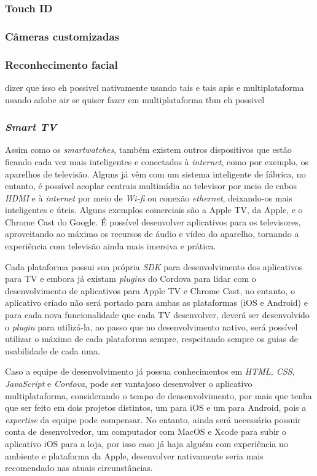 \subsubsection{Touch ID} \label{subsubsec:touchid}

\subsubsection{Câmeras customizadas} \label{subsubsec:customcamera}

\subsubsection{Reconhecimento facial} \label{subsubsec:facial}
dizer que isso eh possivel nativamente usando tais e tais apis e multiplataforma usando adobe air
se quiser fazer em multiplataforma tbm eh possivel

\subsubsection{\textit{Smart TV}} \label{subsubsec:tv}
Assim como os \textit{smartwatches}, também existem outros dispositivos que estão ficando cada vez mais inteligentes e conectados à \textit{internet}, como por exemplo, os aparelhos de televisão. Alguns já vêm
com um sistema inteligente de fábrica, no entanto, é possível acoplar centrais multimídia ao televisor por meio de cabos \textit{HDMI} e à \textit{internet} por meio de \textit{Wi-fi} ou conexão \textit{ethernet}, 
deixando-os mais inteligentes e úteis. Alguns exemplos comerciais são a Apple TV, da Apple, e o Chrome Cast do Google. É possível desenvolver aplicativos para os televisores, aproveitando ao máximo os recursos de 
áudio e vídeo do aparelho, tornando a experiência com televisão ainda mais imersiva e prática. 

Cada plataforma possui sua própria \textit{SDK} para desenvolvimento dos aplicativos para TV e embora já existam \textit{plugins} do Cordova para lidar com o desenvolvimento de aplicativos para Apple TV e Chrome Cast, 
no entanto, o aplicativo criado não será portado para ambas as plataformas (iOS e Android) e para cada nova funcionalidade que cada TV desenvolver, deverá ser desenvolvido o \textit{plugin} para utilizá-la, ao passo que 
no desenvolvimento nativo, será possível utilizar o máximo de cada plataforma sempre, respeitando sempre os guias de usabilidade de cada uma. 

Caso a equipe de desenvolvimento já possua conhecimentos em \textit{HTML, CSS, JavaScript} e \textit{Cordova}, pode ser vantajoso desenvolver o aplicativo multiplataforma, considerando o tempo de densenvolvimento, por 
mais que tenha que ser feito em dois projetos distintos, um para iOS e um para Android, pois a \textit{expertise} da equipe pode compensar. No entanto, ainda será necessário possuir conta de desenvolvedor, um computador com 
MacOS e Xcode para subir o aplicativo iOS para a loja, por isso caso já haja alguém com experiência no ambiente e plataforma da Apple, desenvolver nativamente seria mais recomendado nas atuais circunstâncias. 

